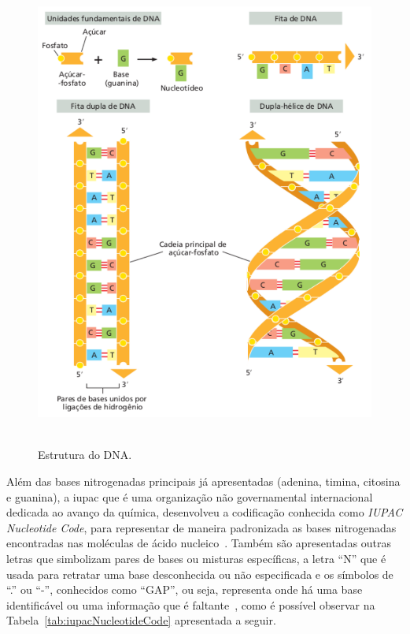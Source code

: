 \begin{figure}[htb]
  \centering
  \caption{Estrutura do DNA.}
  \includegraphics[scale=0.6]{figuras/estruturaDNA_02.pdf}
  ~\label{fig:estruturaDNA}
\end{figure}

Além das bases nitrogenadas principais já apresentadas (\gls{adenina}, \gls{timina}, \gls{citosina} e \gls{guanina}), a \gls{iupac} que é uma organização não governamental internacional dedicada ao avanço da química, desenvolveu a codificação conhecida como \textit{IUPAC Nucleotide Code}, para representar de maneira padronizada as bases nitrogenadas encontradas nas moléculas de ácido nucleico~\cite{iupac_cornish_1985, iupac_hoppe_1986}. Também são apresentadas outras letras que simbolizam pares de bases ou misturas específicas, a letra ``N'' que é usada para retratar uma base desconhecida ou não especificada e os símbolos de ``.'' ou ``-'', conhecidos como ``GAP'', ou seja, representa onde há uma base identificável ou uma informação que é faltante~\cite{iupac_cornish_1985}, como é possível observar na Tabela~\ref{tab:iupacNucleotideCode} apresentada a seguir.

